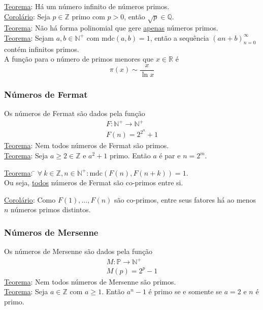 \documentclass{article}
\begin{document}
\vspace{10pt}
\uline{Teorema}: Há um número infinito de números primos. \\[5pt]
\uline{Corolário}: Seja $p \in \mathbb{Z}$ primo com $p > 0$, então $\sqrt{p} \in \mathbb{Q}$.\\[10pt]
\uline{Teorema}: Não há forma polinomial que gere \uline{apenas} números primos. \\[10pt]
\uline{Teorema}: Sejam $a, b \in \mathbb{N}^+$ com $\text{mdc}(a,b) = 1$, então a sequência ${\left( an + b \right)}_{n=0}^{\infty}$ contém infinitos primos. \\[10pt]
A função para o número de primos menores que $x \in \mathbb{R}$ é
\[ \pi(x) \sim \frac{x}{\ln x} \]

\pagebreak

\subsubsection{Números de Fermat}
Os números de Fermat são dados pela função
\begin{gather*}
  F: \mathbb{N}^+ \to \mathbb{N}^+ \\
  F(n) = 2^{2^n} + 1
\end{gather*}
\uline{Teorema}: Nem todos números de Fermat são primos. \\[5pt]
\uline{Teorema}: Seja $a \geq 2 \in \mathbb{Z}$ e $a^2 + 1$ primo. Então $a$ é par e $n = 2^m$.
\begin{tabbing}
  \uline{Teorema}: \= $\forall \: k \in \mathbb{Z}, n \in \mathbb{N}^+: \text{mdc}(F(n), F(n + k)) = 1$. \\
  \> Ou seja, \uline{todos} números de Fermat são co-primos entre si.
\end{tabbing}
\uline{Corolário}: Como $F(1), \hdots, F(n)$ são co-primos, entre seus fatores há ao menos $n$ números primos distintos.

\subsubsection{Números de Mersenne}
Os números de Mersenne são dados pela função
\begin{gather*}
  M: \mathbb{P} \to \mathbb{N}^+ \\
  M(p) = 2^p - 1
\end{gather*}
\uline{Teorema}: Nem todos números de Mersenne são primos. \\[5pt]
\uline{Teorema}: Seja $a \in \mathbb{Z}$ com $a \geq 1$. Então $a^n - 1$ é primo se e somente se $a = 2$ e $n$ é primo.
\end{document}
